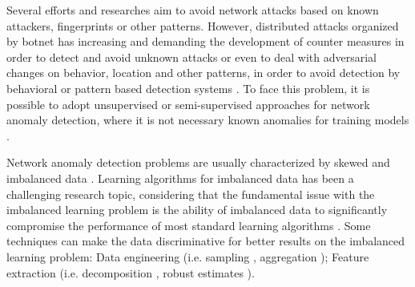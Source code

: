 \documentclass[review]{elsarticle}
\begin{document}
Several efforts and researches aim to avoid network attacks based on known attackers, fingerprints or other patterns. However, distributed attacks organized by botnet has increasing and demanding the development of counter measures in order to detect and avoid unknown attacks or even to deal with adversarial changes on behavior, location and other patterns, in order to avoid detection by behavioral or pattern based detection systems \cite{gu2008botminer, garcia2014empirical,khattak2015botflex,acarali2016survey,wang2017botnet,Wang2018ddosbotnetssurvey}. To face this problem, it is possible to adopt unsupervised or semi-supervised approaches for network anomaly detection, where it is not necessary known anomalies for training models \cite{moustafa2019holistic}.

Network anomaly detection problems are usually characterized by skewed and imbalanced data \cite{Phua2004minority,he2008learning,benson2010network}. Learning algorithms for imbalanced data has been a challenging research topic, considering that the fundamental issue with the imbalanced learning problem is the ability of imbalanced data to significantly compromise the performance of most standard learning algorithms \cite{he2008learning}. Some techniques can make the data discriminative for better results on the imbalanced learning problem: Data engineering (i.e. sampling \cite{he2008learning,gu2008botminer}, aggregation \cite{lakhina2005mining,gu2008botminer,callegari2011novel, garcia2014empirical, acarali2016survey}); Feature extraction (i.e. decomposition \cite{vaswani2018robust}, robust estimates \cite{zhou2017anomaly}). 

\end{document}

